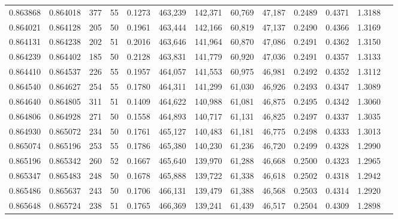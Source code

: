 \begin{tabular}{rrrrrrrrrrrrr}
0.863868 & 0.864018 &   377 &  55 &                                     0.1273 & 463,239 & 142,371 &  60,769 &  47,187 & 0.2489 & 0.4371 & 1.3188 \\
0.864021 & 0.864128 &   205 &  50 &                                     0.1961 & 463,444 & 142,166 &  60,819 &  47,137 & 0.2490 & 0.4366 & 1.3169 \\
0.864131 & 0.864238 &   202 &  51 &                                     0.2016 & 463,646 & 141,964 &  60,870 &  47,086 & 0.2491 & 0.4362 & 1.3150 \\
0.864239 & 0.864402 &   185 &  50 &                                     0.2128 & 463,831 & 141,779 &  60,920 &  47,036 & 0.2491 & 0.4357 & 1.3133 \\
0.864410 & 0.864537 &   226 &  55 &                                     0.1957 & 464,057 & 141,553 &  60,975 &  46,981 & 0.2492 & 0.4352 & 1.3112 \\
0.864540 & 0.864627 &   254 &  55 &                                     0.1780 & 464,311 & 141,299 &  61,030 &  46,926 & 0.2493 & 0.4347 & 1.3089 \\
0.864640 & 0.864805 &   311 &  51 &                                     0.1409 & 464,622 & 140,988 &  61,081 &  46,875 & 0.2495 & 0.4342 & 1.3060 \\
0.864806 & 0.864928 &   271 &  50 &                                     0.1558 & 464,893 & 140,717 &  61,131 &  46,825 & 0.2497 & 0.4337 & 1.3035 \\
0.864930 & 0.865072 &   234 &  50 &                                     0.1761 & 465,127 & 140,483 &  61,181 &  46,775 & 0.2498 & 0.4333 & 1.3013 \\
0.865074 & 0.865196 &   253 &  55 &                                     0.1786 & 465,380 & 140,230 &  61,236 &  46,720 & 0.2499 & 0.4328 & 1.2990 \\
0.865196 & 0.865342 &   260 &  52 &                                     0.1667 & 465,640 & 139,970 &  61,288 &  46,668 & 0.2500 & 0.4323 & 1.2965 \\
0.865347 & 0.865483 &   248 &  50 &                                     0.1678 & 465,888 & 139,722 &  61,338 &  46,618 & 0.2502 & 0.4318 & 1.2942 \\
0.865486 & 0.865637 &   243 &  50 &                                     0.1706 & 466,131 & 139,479 &  61,388 &  46,568 & 0.2503 & 0.4314 & 1.2920 \\
0.865648 & 0.865724 &   238 &  51 &                                     0.1765 & 466,369 & 139,241 &  61,439 &  46,517 & 0.2504 & 0.4309 & 1.2898 \\

\end{tabular}

